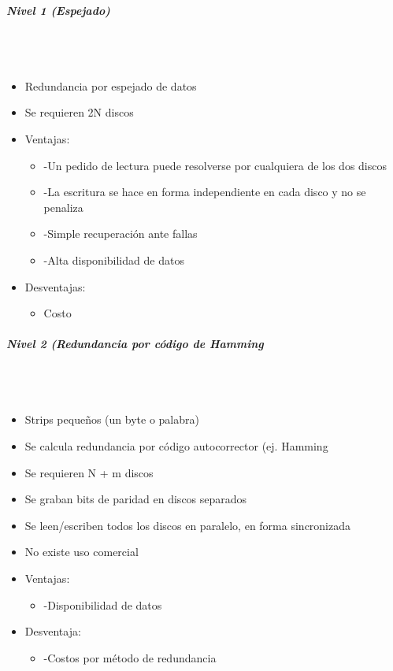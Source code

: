 \subparagraph{Nivel 1 (Espejado)}\mbox{}\\\\%
\begin{itemize}
\item Redundancia por espejado de datos
\item Se requieren 2N discos
\item Ventajas:	
	\begin{itemize}
	\item -Un pedido de lectura puede resolverse por cualquiera de los dos discos
	\item -La escritura se hace en forma independiente en cada disco y no se penaliza
	\item -Simple recuperación ante fallas
	\item -Alta disponibilidad de datos
	\end{itemize}
\item Desventajas:
	\begin{itemize}
	\item Costo
	\end{itemize}
\end{itemize}

\subparagraph{Nivel 2 (Redundancia por código de Hamming}\mbox{}\\\\%
\begin{itemize}
\item Strips pequeños (un byte o palabra)
\item Se calcula redundancia por código autocorrector (ej. Hamming
\item Se requieren N + m discos
\item Se graban bits de paridad en discos separados
\item Se leen/escriben todos los discos en paralelo, en forma sincronizada
\item No existe uso comercial
\item Ventajas:
	\begin{itemize}
	\item -Disponibilidad de datos
	\end{itemize}
\item Desventaja:
	\begin{itemize}
	\item -Costos por método de redundancia
	\end{itemize}
\end{itemize}

